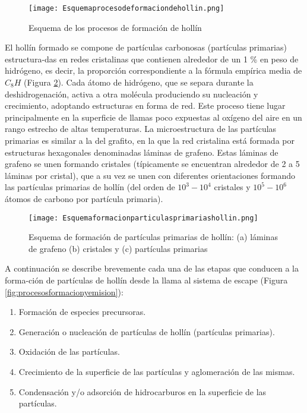 \begin{figure}[ht]
\centering
	\texttt{[image: Esquemaprocesodeformaciondehollin.png]}	 
	\caption{Esquema de los procesos de formación de hollín} \label{fig:esquemaprocesoformacionhollin}
\end{figure} 

\par El hollín formado se compone de partículas carbonosas (partículas primarias) estructura-das en redes cristalinas que contienen alrededor de un 1 \% en peso de hidrógeno, es decir, la proporción correspondiente a la fórmula empírica media de $C_8H$ (Figura \ref{fig:esquemaformacionparticulasprimariashollin}). Cada átomo de hidrógeno, que se separa durante la deshidrogenación, activa a otra molécula produciendo su nucleación y crecimiento, adoptando estructuras en forma de red. Este proceso tiene lugar principalmente en la superficie de llamas poco expuestas al oxígeno del aire en un rango estrecho de altas temperaturas. La microestructura de las partículas primarias es similar a la del grafito, en la que la red cristalina está formada por estructuras hexagonales denominadas láminas de grafeno. Estas láminas de grafeno se unen formando cristales (típicamente se encuentran alrededor de 2 a 5 láminas por cristal), que a su vez se unen con diferentes orientaciones formando las partículas primarias de hollín (del orden de $10^3-10^4$ cristales y $10^5-10^6$ átomos de carbono por partícula primaria). 

\begin{figure}[ht]
\centering
	\texttt{[image: Esquemaformacionparticulasprimariashollin.png]}	 
	\caption[Esquema de formación de partículas primarias de hollín]{Esquema de formación de partículas primarias de hollín: (a) láminas de grafeno (b) cristales y (c) partículas primarias} \label{fig:esquemaformacionparticulasprimariashollin}
\end{figure} 

A continuación se describe brevemente cada una de las etapas que conducen a la forma-ción de partículas de hollín desde la llama al sistema de escape (Figura \ref{fig:procesosformacionyemision}): 

\begin{enumerate}
\item Formación de especies precursoras.
\item Generación o nucleación de partículas de hollín (partículas primarias).
\item Oxidación de las partículas.
\item Crecimiento de la superficie de las partículas y aglomeración de las mismas.
\item Condensación y/o adsorción de hidrocarburos en la superficie de las partículas.
\end{enumerate}

